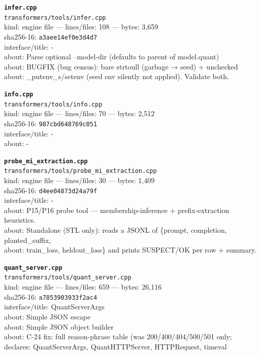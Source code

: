 \noindent\textbf{\texttt{infer.cpp}}\\
\texttt{transformers/tools/infer.cpp}\\
kind: engine file --- lines/files: 108 --- bytes: 3,659\\
sha256-16: \texttt{a3aee14ef0e3d4d7}\\
interface/title: -\\
about: Parse optional --model-dir (defaults to parent of model.quant)\\
about: BUGFIX (bug census): bare strtoull (garbage → seed) + unchecked\\
about: \_putenv\_s/setenv (seed env silently not applied). Validate both.\\
\vspace*{6.0pt}
\newpage

\noindent\textbf{\texttt{info.cpp}}\\
\texttt{transformers/tools/info.cpp}\\
kind: engine file --- lines/files: 70 --- bytes: 2,512\\
sha256-16: \texttt{987cbd648769c051}\\
interface/title: -\\
about: -\\
\vspace*{6.0pt}

\noindent\textbf{\texttt{probe\_mi\_extraction.cpp}}\\
\texttt{transformers/tools/probe\_mi\_extraction.cpp}\\
kind: engine file --- lines/files: 30 --- bytes: 1,409\\
sha256-16: \texttt{d4ee04873d24a79f}\\
interface/title: -\\
about: P15/P16 probe tool — membership-inference + prefix-extraction heuristics.\\
about: Standalone (STL only): reads a JSONL of \{prompt, completion, planted\_suffix,\\
about: train\_loss, heldout\_loss\} and prints SUSPECT/OK per row + summary.\\
\vspace*{6.0pt}

\noindent\textbf{\texttt{quant\_server.cpp}}\\
\texttt{transformers/tools/quant\_server.cpp}\\
kind: engine file --- lines/files: 659 --- bytes: 26,116\\
sha256-16: \texttt{a7853903933f2ac4}\\
interface/title: QuantServerArgs\\
about: Simple JSON escape\\
about: Simple JSON object builder\\
about: C-24 fix: full reason-phrase table (was 200/400/404/500/501 only;\\
declares: QuantServerArgs, QuantHTTPServer, HTTPRequest, timeval\\
\vspace*{6.0pt}

